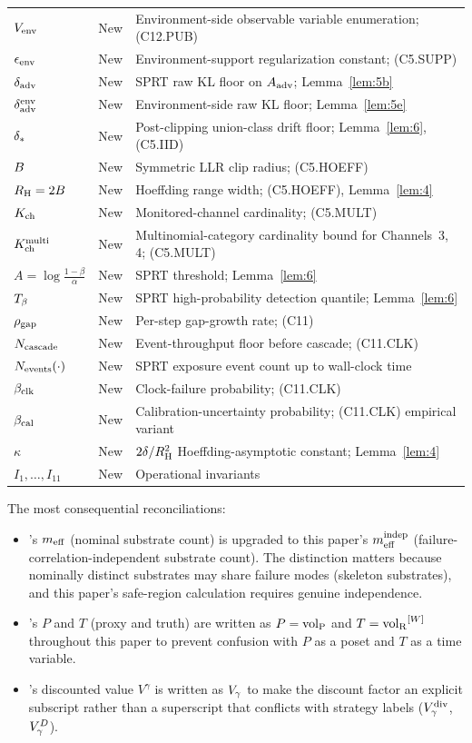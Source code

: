 {\begin{longtable}{@{}p{} p{} p{}@{}}
$V_{\mathrm{env}}$ & New & Environment-side observable variable enumeration; (C12.PUB) \\
$\epsilon_{\mathrm{env}}$ & New & Environment-support regularization constant; (C5.SUPP) \\
$\delta_{\mathrm{adv}}$ & New & SPRT raw KL floor on $A_{\mathrm{adv}}$; Lemma~\ref{lem:5b} \\
$\delta_{\mathrm{adv}}^{\mathrm{env}}$ & New & Environment-side raw KL floor; Lemma~\ref{lem:5e} \\
$\delta_{*}$ & New & Post-clipping union-class drift floor; Lemma~\ref{lem:6}, (C5.IID) \\
$B$ & New & Symmetric LLR clip radius; (C5.HOEFF) \\
$R_{\mathrm{H}} = 2B$ & New & Hoeffding range width; (C5.HOEFF), Lemma~\ref{lem:4} \\
$K_{\mathrm{ch}}$ & New & Monitored-channel cardinality; (C5.MULT) \\
$K_{\mathrm{ch}}^{\mathrm{multi}}$ & New & Multinomial-category cardinality bound for Channels~3, 4; (C5.MULT) \\
$A = \log\!\frac{1-\beta}{\alpha}$ & New & SPRT threshold; Lemma~\ref{lem:6} \\
$T_{\beta}$ & New & SPRT high-probability detection quantile; Lemma~\ref{lem:6} \\
$\rho_{\mathrm{gap}}$ & New & Per-step gap-growth rate; (C11) \\
$N_{\mathrm{cascade}}$ & New & Event-throughput floor before cascade; (C11.CLK) \\
$N_{\mathrm{events}}(\cdot)$ & New & SPRT exposure event count up to wall-clock time \\
$\beta_{\mathrm{clk}}$ & New & Clock-failure probability; (C11.CLK) \\
$\beta_{\mathrm{cal}}$ & New & Calibration-uncertainty probability; (C11.CLK) empirical variant \\
$\kappa$ & New & $2\delta/R_{\mathrm{H}}^2$ Hoeffding-asymptotic constant; Lemma~\ref{lem:4} \\
$I_1, \ldots, I_{11}$ & New & Operational invariants \\
\end{longtable}
}

The most consequential reconciliations:
\begin{itemize}
\item \citep[Phase Redundancy]{lasser2026phase}'s $m_{\mathrm{eff}}$ (nominal
  substrate count) is upgraded to this paper's $m_{\mathrm{eff}}^{\mathrm{indep}}$
  (failure-correlation-independent substrate count).  The
  distinction matters because nominally distinct substrates may
  share failure modes (skeleton substrates), and this paper's
  safe-region calculation requires genuine independence.
\item \citep[Microfoundation]{lasser2026micro}'s $P$ and $T$ (proxy
  and truth) are written as $P = {\operatorname{vol}_{\mathrm{P}}}$ and $T =
  {\operatorname{vol}_{\mathrm{R}}}^{[W]}$ throughout this paper to prevent confusion with $P$ as
  a poset and $T$ as a time variable.
\item \citep[Horizon Aware]{lasser2026horizon}'s discounted value
  $V^\gamma$ is written as $V_{\gamma}$ to make the discount factor an
  explicit subscript rather than a superscript that conflicts with
  strategy labels ($V_{\gamma}^{\mathrm{div}}$, $V_{\gamma}^D$).
\end{itemize}
